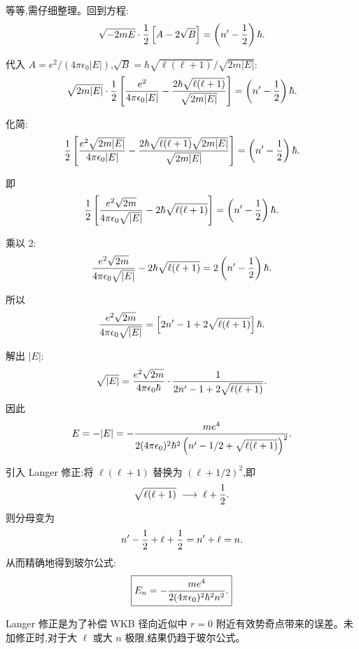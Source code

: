 \begin{solution}
等等,需仔细整理。回到方程:
\[
\sqrt{-2mE}\cdot{1\over2}\left[A-2\sqrt{B}\right]
=\left(n'-{1\over2}\right)\hbar.
\]

代入 $A={e^2/(4\pi\epsilon_0|E|)}$,$\sqrt{B}={\hbar\sqrt{\ell(\ell+1)}/\sqrt{2m|E|}}$:
\[
\sqrt{2m|E|}\cdot{1\over2}
\left[{e^2\over4\pi\epsilon_0|E|}-{2\hbar\sqrt{\ell(\ell+1)}\over\sqrt{2m|E|}}\right]
=\left(n'-{1\over2}\right)\hbar.
\]

化简:
\[
{1\over2}\left[{e^2\sqrt{2m|E|}\over4\pi\epsilon_0|E|}
-{2\hbar\sqrt{\ell(\ell+1)}\sqrt{2m|E|}\over\sqrt{2m|E|}}\right]
=\left(n'-{1\over2}\right)\hbar.
\]

即
\[
{1\over2}\left[{e^2\sqrt{2m}\over4\pi\epsilon_0\sqrt{|E|}}
-2\hbar\sqrt{\ell(\ell+1)}\right]
=\left(n'-{1\over2}\right)\hbar.
\]

乘以 2:
\[
{e^2\sqrt{2m}\over4\pi\epsilon_0\sqrt{|E|}}
-2\hbar\sqrt{\ell(\ell+1)}
=2\left(n'-{1\over2}\right)\hbar.
\]

所以
\[
{e^2\sqrt{2m}\over4\pi\epsilon_0\sqrt{|E|}}
=\left[2n'-1+2\sqrt{\ell(\ell+1)}\right]\hbar.
\]

解出 $|E|$:
\[
\sqrt{|E|}={e^2\sqrt{2m}\over4\pi\epsilon_0\hbar}
\cdot{1\over2n'-1+2\sqrt{\ell(\ell+1)}}.
\]
因此
\[
E=-|E|=-{m e^4\over2(4\pi\epsilon_0)^2\hbar^2
\left(n'-1/2+\sqrt{\ell(\ell+1)}\right)^2}.
\]

引入 Langer 修正:将 $\ell(\ell+1)$ 替换为 $(\ell+1/2)^2$,即
\[
\sqrt{\ell(\ell+1)}\;\longrightarrow\;\ell+{1\over2}.
\]
则分母变为
\[
n'-{1\over2}+\ell+{1\over2}=n'+\ell=n.
\]
从而精确地得到玻尔公式:
\[
\boxed{E_n=-{m e^4\over2(4\pi\epsilon_0)^2\hbar^2 n^2}.}
\]

Langer 修正是为了补偿 WKB 径向近似中 $r=0$ 附近有效势奇点带来的误差。未加修正时,对于大 $\ell$ 或大 $n$ 极限,结果仍趋于玻尔公式。
\end{solution}

